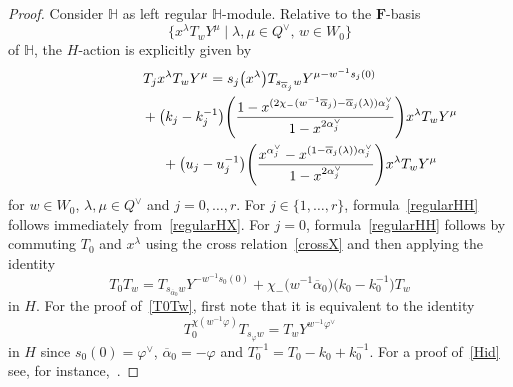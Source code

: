 \begin{proof}
Consider $\mathbb{H}$ as left regular $\mathbb{H}$-module.
Relative
to the $\mathbf{F}$-basis
\[
\bigl\{x^\lambda T_w Y^\mu\mid \lambda,\mu\in Q^\vee,\, w\in W_0\bigr\}
\]
of $\mathbb{H}$, the $H$-action is explicitly given by
\begin{gather}
T_jx^\lambda T_wY^\mu=s_j\bigl(x^\lambda\bigr)T_{s_{\overline{\alpha}_j}w}Y^{\mu-w^{-1}s_j(0)} \nonumber\\
\hphantom{T_jx^\lambda T_wY^\mu=}{}
+\big(k_j-k_j^{-1}\big)\Biggl(\frac{1-x^{(2\chi_-(w^{-1}\overline{\alpha}_j)-\overline{\alpha}_j(\lambda))\alpha_j^\vee}}{1-x^{2\alpha_j^\vee}}\Biggr)x^\lambda T_wY^\mu\nonumber\\
\hphantom{T_jx^\lambda T_wY^\mu=}{}
+\big(u_j-u_j^{-1}\big)\Biggl(\frac{x^{\alpha_j^\vee}-x^{(1-\overline{\alpha}_j(\lambda))\alpha_j^\vee}}{1-x^{2\alpha_j^\vee}}\Biggr)x^\lambda T_w Y^\mu\label{regularHH}
\end{gather}
for $w\in W_0$, $\lambda,\mu\in Q^\vee$ and $j=0,\dots,r$. For $j\in\{1,\dots,r\}$, formula~\eqref{regularHH} follows immediately from~\eqref{regularHX}.
For $j=0$, formula~\eqref{regularHH} follows by commuting $T_0$ and $x^\lambda$ using the cross relation~\eqref{crossX} and then applying
the identity
\begin{equation}\label{T0Tw}
T_0T_w=T_{s_{\overline{\alpha}_0}w}Y^{-w^{-1}s_0(0)}+\chi_-\bigl(w^{-1}\overline{\alpha}_0\bigr)\bigl(k_0-k_0^{-1}\bigr)T_w
\end{equation}
in $H$. For the proof of~\eqref{T0Tw}, first note that it is equivalent to the identity
\begin{equation}\label{Hid}
T_0^{\chi(w^{-1}\varphi)}T_{s_\varphi w}=T_wY^{w^{-1}\varphi^\vee}
\end{equation}
in $H$ since $s_0(0)=\varphi^\vee$, $\overline{\alpha}_0=-\varphi$ and $T_0^{-1}=T_0-k_0+k_0^{-1}$.
For a proof of~\eqref{Hid} see, for instance,~\cite[(3.3.6)]{Ma}.


\end{proof}

